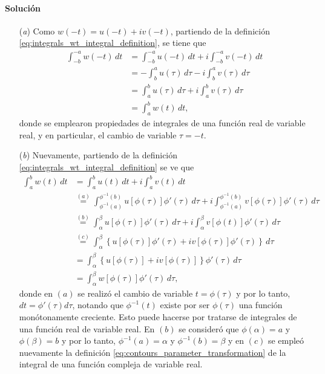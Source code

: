 \documentclass[a4paper]{report}
\begin{document}
\paragraph{Solución} 
\begin{enumerate}
 \item[(\textit{a})] Como \(w(-t)=u(-t)+iv(-t)\), partiendo de la definición \ref{eq:integrals_wt_integral_definition}, se tiene que 
 \begin{align*}
  \int_{-b}^{-a}w(-t)\,dt&=\int_{-b}^{-a}u(-t)\,dt+i\int_{-b}^{-a}v(-t)\,dt\\
    &=-\int_{b}^{a}u(\tau)\,d\tau-i\int_{b}^{a}v(\tau)\,d\tau\\
    &=\int_{a}^{b}u(\tau)\,d\tau+i\int_{a}^{b}v(\tau)\,d\tau\\
    &=\int_{a}^{b}w(t)\,dt,
 \end{align*}
 donde se emplearon propiedades de integrales de una función real de variable real, y en particular, el cambio de variable \(\tau=-t\).
 \item[(\textit{b})] Nuevamente, partiendo de la definición \ref{eq:integrals_wt_integral_definition} se ve que 
 \begin{align*}
  \int_{a}^{b}w(t)\,dt&=\int_{a}^{b}u(t)\,dt+i\int_{a}^{b}v(t)\,dt\\
   &\overset{(a)}{=}\int_{\phi^{-1}(a)}^{\phi^{-1}(b)}u[\phi(\tau)]\phi'(\tau)\,d\tau+i\int_{\phi^{-1}(a)}^{\phi^{-1}(b)}v[\phi(\tau)]\phi'(\tau)\,d\tau\\
   &\overset{(b)}{=}\int_\alpha^\beta u[\phi(\tau)]\phi'(\tau)\,d\tau+i\int_\alpha^\beta v[\phi(t)]\phi'(\tau)\,d\tau\\
   &\overset{(c)}{=}\int_\alpha^\beta\left\{u[\phi(\tau)]\phi'(\tau)+iv[\phi(\tau)]\phi'(\tau)\right\}\,d\tau\\
   &=\int_\alpha^\beta\left\{u[\phi(\tau)]+iv[\phi(\tau)]\right\}\phi'(\tau)\,d\tau\\
   &=\int_\alpha^\beta w[\phi(\tau)]\phi'(\tau)\,d\tau,
 \end{align*}
 donde en \((a)\) se realizó el cambio de variable \(t=\phi(\tau)\) y por lo tanto, \(dt=\phi'(\tau)d\tau\), notando que \(\phi^{-1}(t)\) existe por ser \(\phi(\tau)\) una función monótonamente creciente. Esto puede hacerse por tratarse de integrales de una función real de variable real. En \((b)\) se consideró que \(\phi(\alpha)=a\) y \(\phi(\beta)=b\) y por lo tanto, \(\phi^{-1}(a)=\alpha\) y \(\phi^{-1}(b)=\beta\) y en \((c)\) se empleó nuevamente la definición \ref{eq:contours_parameter_transformation} de la integral de una función compleja de variable real.
\end{enumerate}
\end{document}
